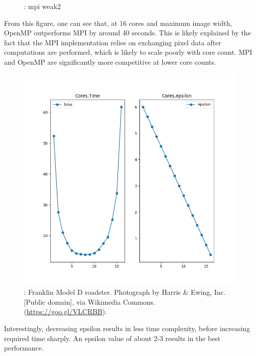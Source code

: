 \begin{figure}[h]
\begin{minipage}{0.45\linewidth}
 \caption{: mpi weak2 }
    \label{fig:mpi_weak2}
    \end{minipage}
\end{figure}

From this figure, one can see that, at 16 cores and maximum image width, OpenMP outperforms MPI by around 40 seconds. This is likely explained by the fact that the MPI implementation relies on exchanging pixel data after computations are performed, which is likely to scale poorly with core count. MPI and OpenMP are significantly more competitive at lower core counts.


\begin{figure}[h]
  \centering
  \includegraphics[width=0.75\linewidth]{omp_weak.out}
  \caption{: Franklin Model D roadster. Photograph by Harris \&
    Ewing, Inc. [Public domain], via Wikimedia
    Commons. (\url{https://goo.gl/VLCRBB}).}
    \label{fig:omp_weak}
\end{figure}


Interestingly, decreasing epsilon results in less time complexity, before increasing required time sharply. An epsilon value of about 2-3 results in the best performance.


